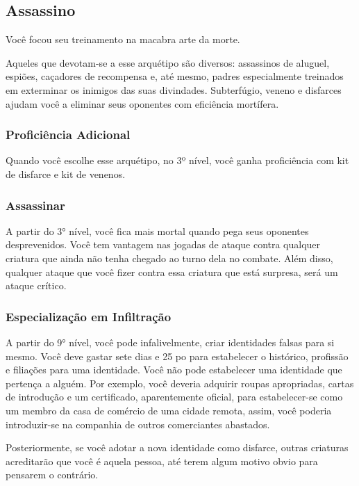 \documentclass{RPG_Adventure}[2021/10/20]
\begin{document}
\begin{multicols}{2}
\subsection*{Assassino}%

Você focou seu treinamento na macabra arte da morte.

Aqueles que devotam-se a esse arquétipo são diversos: assassinos de aluguel,
espiões, caçadores de recompensa e, até mesmo, padres especialmente treinados em
exterminar os inimigos das suas divindades. Subterfúgio, veneno e disfarces
ajudam você a eliminar seus oponentes com eficiência mortífera.

\subsubsection{Proficiência Adicional}%

Quando você escolhe esse arquétipo, no 3º nível, você ganha proficiência com kit
de disfarce e kit de venenos.

\subsubsection{Assassinar}%

A partir do 3° nível, você fica mais mortal quando pega seus oponentes
desprevenidos. Você tem vantagem nas jogadas de ataque contra qualquer criatura
que ainda não tenha chegado ao turno dela no combate. Além disso, qualquer
ataque que você fizer contra essa criatura que está surpresa, será um ataque
crítico.

\subsubsection{Especialização em Infiltração}%

A partir do 9° nível, você pode infalivelmente, criar identidades falsas para si
mesmo. Você deve gastar sete dias e 25 po para estabelecer o histórico,
profissão e filiações para uma identidade. Você não pode estabelecer uma
identidade que pertença a alguém. Por exemplo, você deveria adquirir roupas
apropriadas, cartas de introdução e um certificado, aparentemente oficial, para
estabelecer-se como um membro da casa de comércio de uma cidade remota, assim,
você poderia introduzir-se na companhia de outros comerciantes abastados.

Posteriormente, se você adotar a nova identidade como disfarce, outras criaturas
acreditarão que você é aquela pessoa, até terem algum motivo obvio para pensarem
o contrário.


\end{multicols}
\end{document}

